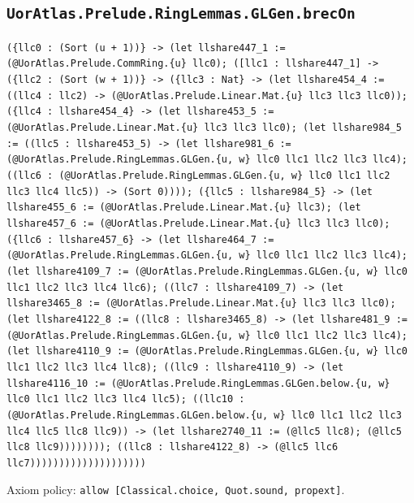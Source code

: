 \documentclass[11pt]{article}
\begin{document}
\subsection*{\texttt{UorAtlas.Prelude.RingLemmas.GLGen.brecOn}}
\noindent\texttt{(\{llc0 : (Sort (u + 1))\} -> (let llshare447\_1 := (@UorAtlas.Prelude.CommRing.\{u\} llc0); ([llc1 : llshare447\_1] -> (\{llc2 : (Sort (w + 1))\} -> (\{llc3 : Nat\} -> (let llshare454\_4 := ((llc4 : llc2) -> (@UorAtlas.Prelude.Linear.Mat.\{u\} llc3 llc3 llc0)); (\{llc4 : llshare454\_4\} -> (let llshare453\_5 := (@UorAtlas.Prelude.Linear.Mat.\{u\} llc3 llc3 llc0); (let llshare984\_5 := ((llc5 : llshare453\_5) -> (let llshare981\_6 := (@UorAtlas.Prelude.RingLemmas.GLGen.\{u, w\} llc0 llc1 llc2 llc3 llc4); ((llc6 : (@UorAtlas.Prelude.RingLemmas.GLGen.\{u, w\} llc0 llc1 llc2 llc3 llc4 llc5)) -> (Sort 0)))); (\{llc5 : llshare984\_5\} -> (let llshare455\_6 := (@UorAtlas.Prelude.Linear.Mat.\{u\} llc3); (let llshare457\_6 := (@UorAtlas.Prelude.Linear.Mat.\{u\} llc3 llc3 llc0); (\{llc6 : llshare457\_6\} -> (let llshare464\_7 := (@UorAtlas.Prelude.RingLemmas.GLGen.\{u, w\} llc0 llc1 llc2 llc3 llc4); (let llshare4109\_7 := (@UorAtlas.Prelude.RingLemmas.GLGen.\{u, w\} llc0 llc1 llc2 llc3 llc4 llc6); ((llc7 : llshare4109\_7) -> (let llshare3465\_8 := (@UorAtlas.Prelude.Linear.Mat.\{u\} llc3 llc3 llc0); (let llshare4122\_8 := ((llc8 : llshare3465\_8) -> (let llshare481\_9 := (@UorAtlas.Prelude.RingLemmas.GLGen.\{u, w\} llc0 llc1 llc2 llc3 llc4); (let llshare4110\_9 := (@UorAtlas.Prelude.RingLemmas.GLGen.\{u, w\} llc0 llc1 llc2 llc3 llc4 llc8); ((llc9 : llshare4110\_9) -> (let llshare4116\_10 := (@UorAtlas.Prelude.RingLemmas.GLGen.below.\{u, w\} llc0 llc1 llc2 llc3 llc4 llc5); ((llc10 : (@UorAtlas.Prelude.RingLemmas.GLGen.below.\{u, w\} llc0 llc1 llc2 llc3 llc4 llc5 llc8 llc9)) -> (let llshare2740\_11 := (@llc5 llc8); (@llc5 llc8 llc9)))))))); ((llc8 : llshare4122\_8) -> (@llc5 llc6 llc7))))))))))))))))))))}\par
\noindent Axiom policy: \texttt{allow [Classical.choice, Quot.sound, propext]}.\par
\end{document}

